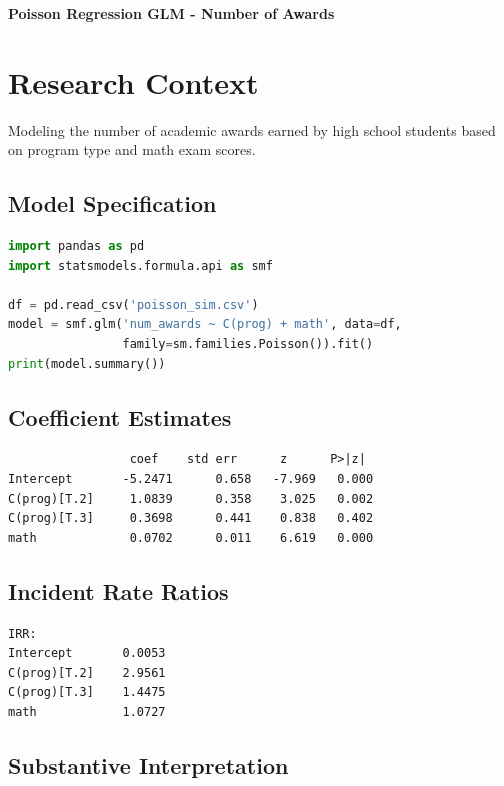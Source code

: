 \documentclass[12pt, a4paper]{article}
\newcounter{problemcounter}
\newcommand{\problemtitle}[1]{%
    \vspace{1cm}
    \begin{tcolorbox}[
        colback=DeepForest!5,
        colframe=DeepForest,
        arc=15pt,
        boxrule=1.2pt,
        left=20pt,
        right=20pt,
        top=12pt,
        bottom=12pt,
        enhanced,
        attach boxed title to top center={yshift=-8pt},
        boxed title style={
            colback=AmberSunset,
            colframe=DeepForest,
            arc=10pt,
            outer arc=10pt,
            boxrule=0.8pt,
            sharp corners,
            },
        title={\color{white}\large\sffamily\bfseries \faTasks \quad PROBLEM \arabic{problemcounter}}
    ]
        \centering
        {\color{DeepForest}\Large\bfseries\sffamily #1}
    \end{tcolorbox}
    \stepcounter{problemcounter}
    \vspace{0.3cm}
}
\begin{document}
\newpage

\problemtitle{Poisson Regression GLM - Number of Awards}

\section*{Research Context}
Modeling the number of academic awards earned by high school students based on program type and math exam scores.

\subsection*{Model Specification}

\begin{lstlisting}[language=Python]
import pandas as pd
import statsmodels.formula.api as smf

df = pd.read_csv('poisson_sim.csv')
model = smf.glm('num_awards ~ C(prog) + math', data=df,
                family=sm.families.Poisson()).fit()
print(model.summary())
\end{lstlisting}

\subsection*{Coefficient Estimates}

\begin{outputbox}
\begin{verbatim}
                 coef    std err      z      P>|z|
Intercept       -5.2471      0.658   -7.969   0.000
C(prog)[T.2]     1.0839      0.358    3.025   0.002
C(prog)[T.3]     0.3698      0.441    0.838   0.402
math             0.0702      0.011    6.619   0.000
\end{verbatim}
\end{outputbox}

\subsection*{Incident Rate Ratios}

\begin{outputbox}
\begin{verbatim}
IRR:
Intercept       0.0053
C(prog)[T.2]    2.9561
C(prog)[T.3]    1.4475
math            1.0727
\end{verbatim}
\end{outputbox}

\subsection*{Substantive Interpretation}
\end{document}

